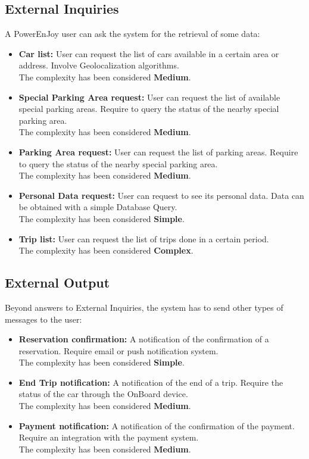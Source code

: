 \subsection{External Inquiries} 
A PowerEnJoy user can ask the system for the retrieval of some data:
\begin{itemize}
\item \textbf{Car list:} User can request the list of cars available in a certain area or address. Involve Geolocalization algorithms.  \\The complexity has been considered \textbf{Medium}.
\item  \textbf{Special Parking Area request:} User can request the list of available special parking areas. Require to query the status of the nearby special parking area.\\The complexity has been considered \textbf{Medium}.
\item  \textbf{Parking Area request:} User can request the list of parking areas. Require to query the status of the nearby special parking area. \\The complexity has been considered \textbf{Medium}.
\item  \textbf{Personal Data request:} User can request to see its personal data. Data can be obtained with a simple Database Query. \\The complexity has been considered \textbf{Simple}.
\item  \textbf{Trip list:} User can request the list of trips done in a certain period.\\
The complexity has been considered \textbf{Complex}.
\end{itemize}


\subsection{External Output} 
Beyond answers to External Inquiries, the system has to send other types of messages to the user:
\begin{itemize}
\item \textbf{Reservation confirmation:} A notification of the confirmation of a reservation. Require email or push notification system. \\The complexity has been considered \textbf{Simple}.
\item \textbf{End Trip notification:} A notification of the end of a trip. Require the status of the car through the OnBoard device. \\The complexity has been considered \textbf{Medium}.
\item \textbf{Payment notification:} A notification of the confirmation of the payment. Require an integration with the payment system. \\The complexity has been considered \textbf{Medium}.
\end{itemize}

